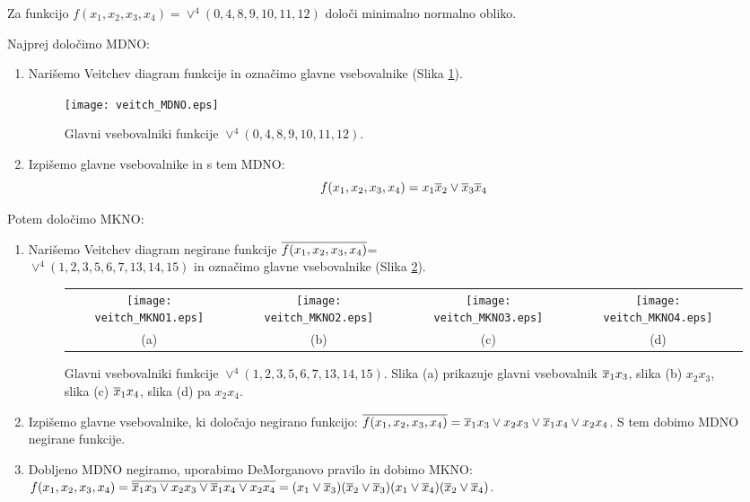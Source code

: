 \begin{zgled}
Za funkcijo $f(x_1,x_2,x_3,x_4) = \vee^4(0,4,8,9,10,11,12)$ določi minimalno normalno obliko.\\
\end{zgled}
\begin{resitev}
Najprej določimo MDNO:

\begin{enumerate}
\item Narišemo Veitchev diagram funkcije in označimo glavne vsebovalnike (Slika \ref{fig:Veitch_MDNO}).

\begin{figure}[ht]
\begin{center}
	\texttt{[image: veitch\_MDNO.eps]}
\end{center}
\caption{Glavni vsebovalniki funkcije $\vee^4(0,4,8,9,10,11,12)$.}
\label{fig:Veitch_MDNO}
\end{figure}

\item Izpišemo glavne vsebovalnike in s tem MDNO:
$$f(x_1,x_2,x_3,x_4)=x_1 \overline x_2 \vee \overline x_3 \overline x_4$$
\end{enumerate}

Potem določimo MKNO:
\begin{enumerate}
\item Narišemo Veitchev diagram negirane funkcije $\overline{f(x_1,x_2,x_3,x_4)}$= \\$\vee^4(1,2,3,5,6,7,13,14,15)$ in označimo glavne vsebovalnike (Slika \ref{fig:Veitch_MKNO}). 
\begin{figure}[ht]
\begin{center}
	\begin{tabular}{cccc}
		\texttt{[image: veitch\_MKNO1.eps]} & \texttt{[image: veitch\_MKNO2.eps]} & \texttt{[image: veitch\_MKNO3.eps]} & \texttt{[image: veitch\_MKNO4.eps]}\\
		(a) & (b) & (c) & (d)\\
	\end{tabular}		 	
\end{center}
\caption{Glavni vsebovalniki funkcije $\vee^4(1,2,3,5,6,7,13,14,15)$. Slika (a) prikazuje glavni vsebovalnik $\overline x_1 x_3$, slika (b) $x_2 x_3$, slika (c) $\overline x_1 x_4$, slika (d) pa $x_2 x_4$.}
\label{fig:Veitch_MKNO}
\end{figure}

\item Izpišemo glavne vsebovalnike, ki določajo negirano funkcijo: $\overline{f(x_1,x_2,x_3,x_4)} = \overline x_1 x_3 \vee x_2 x_3 \vee \overline x_1 x_4 \vee x_2 x_4$. S tem dobimo MDNO negirane funkcije.
\item Dobljeno MDNO negiramo, uporabimo DeMorganovo pravilo in dobimo MKNO:  $f(x_1,x_2,x_3,x_4) = \overline{\overline x_1 x_3 \vee x_2 x_3 \vee \overline x_1 x_4 \vee x_2 x_4} = (x_1 \vee \overline x_3)(\overline x_2 \vee \overline x_3)(x_1 \vee \overline x_4)(\overline x_2 \vee \overline x_4)$.
\end{enumerate}


\end{resitev}
